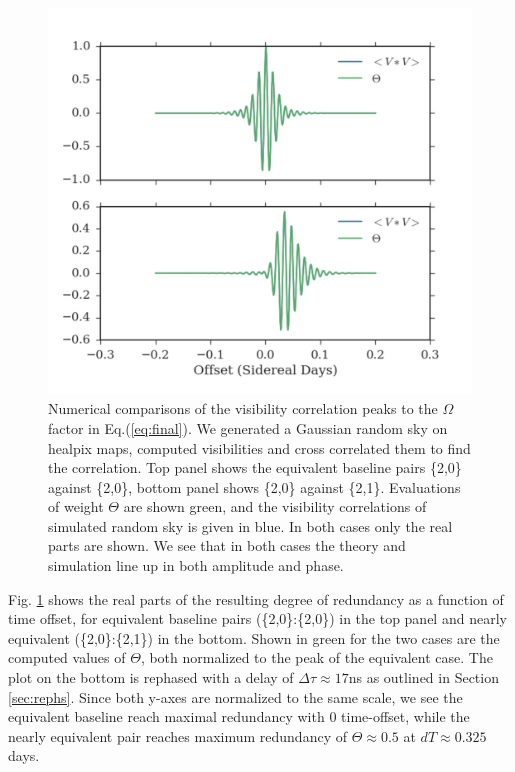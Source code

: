 \documentclass[twocolumn,apj,numberedappendix]{emulateapj}
\renewcommand\[{\begin{equation}}
\renewcommand\]{\end{equation}}
\begin{document}
\begin{figure}[h]
\includegraphics[width=\linewidth]{numerics}

\caption{Numerical comparisons of the visibility correlation peaks to the $\Omega$ factor in Eq.(\ref{eq:final}). We generated a Gaussian random sky on healpix maps, computed visibilities and cross correlated them to find the correlation.  Top panel shows the equivalent baseline pairs \{2,0\} against \{2,0\}, bottom panel shows \{2,0\} against \{2,1\}.  Evaluations of weight $\Theta$ are shown green, and the visibility correlations of simulated random sky is given in blue. In both cases only the real parts are shown. We see that in both cases the theory and simulation line up in both amplitude and phase.}
\label{fig:numerics}
\end{figure}

Fig. \ref{fig:numerics} shows the real parts of the resulting degree of redundancy as a function of time offset, for equivalent baseline pairs (\{2,0\}:\{2,0\}) in the top panel and nearly equivalent (\{2,0\}:\{2,1\}) in the bottom. Shown in green for the two cases are the computed values of $\Theta$, both normalized to the peak of the equivalent case. The plot on the bottom is rephased with a delay of $\Delta\tau\approx17$ns as outlined in Section \ref{sec:rephs}. Since both y-axes are normalized to the same scale, we see the equivalent baseline reach maximal redundancy with 0 time-offset, while the nearly equivalent pair reaches maximum redundancy of $\Theta\approx0.5$ at $dT\approx0.325$days. 
\end{document}
